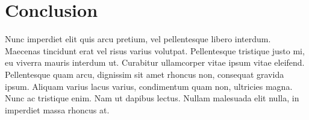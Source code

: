 \documentclass[
]{book}
\begin{document}
\hypertarget{conclusion}{%
\chapter{Conclusion}\label{conclusion}}

Nunc imperdiet elit quis arcu pretium, vel pellentesque libero interdum. Maecenas tincidunt erat vel risus varius volutpat. Pellentesque tristique justo mi, eu viverra mauris interdum ut. Curabitur ullamcorper vitae ipsum vitae eleifend. Pellentesque quam arcu, dignissim sit amet rhoncus non, consequat gravida ipsum. Aliquam varius lacus varius, condimentum quam non, ultricies magna. Nunc ac tristique enim. Nam ut dapibus lectus. Nullam malesuada elit nulla, in imperdiet massa rhoncus at.

  
\end{document}
